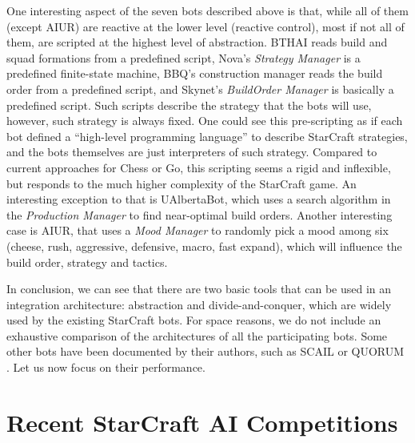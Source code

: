 \documentclass{llncs}
\begin{document}
One  interesting aspect  of the  seven bots  described above  is that,
while all  of them (except AIUR) are  reactive at the  lower level
(reactive  control), most  if not  all of  them, are  scripted  at the
highest level  of abstraction. BTHAI reads build  and squad formations
from  a  predefined  script,   Nova's  {\em  Strategy  Manager}  is  a
predefined finite-state machine,  BBQ's construction manager reads the
build  order from a  predefined script,  and Skynet's  {\em BuildOrder
  Manager} is basically a predefined script. Such scripts describe the
strategy  that the  bots will  use, however,  such strategy  is always
fixed.   One could see  this pre-scripting  as if  each bot  defined a
``high-level programming language''  to describe StarCraft strategies,
and   the   bots   themselves    are   just   interpreters   of   such
strategy.  Compared  to  current  approaches  for Chess  or  Go,  this
scripting  seems a  rigid and  inflexible,  but responds  to the  much
higher complexity of the  StarCraft game.  An interesting exception to
that  is  UAlbertaBot, which  uses  a  search  algorithm in  the  {\em
  Production  Manager}  to find  near-optimal  build orders.   Another
interesting case is  AIUR, that uses a {\em  Mood Manager} to randomly
pick  a mood among  six (cheese,  rush, aggressive,  defensive, macro,
fast  expand), which  will  influence the  build  order, strategy  and
tactics. %

In conclusion, we can see that there are two basic tools that can be used in an integration architecture: abstraction and divide-and-conquer, which are widely used by the existing StarCraft bots. For space reasons, we do not include an exhaustive comparison of the architectures of all the participating bots. Some other bots have been documented by their authors, such as SCAIL \cite{YoungSCAIL} or QUORUM \cite{young2012evolutionary}.
Let us now focus on their performance.



\section{Recent StarCraft AI Competitions}\label{sec:competition}
\end{document}
